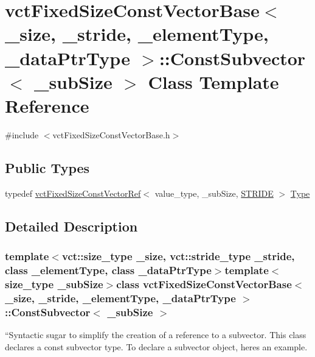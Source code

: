 \hypertarget{classvct_fixed_size_const_vector_base_1_1_const_subvector}{}\section{vct\+Fixed\+Size\+Const\+Vector\+Base$<$ \+\_\+size, \+\_\+stride, \+\_\+element\+Type, \+\_\+data\+Ptr\+Type $>$\+:\+:Const\+Subvector$<$ \+\_\+sub\+Size $>$ Class Template Reference}
\label{classvct_fixed_size_const_vector_base_1_1_const_subvector}


{\ttfamily \#include $<$vct\+Fixed\+Size\+Const\+Vector\+Base.\+h$>$}

\subsection*{Public Types}
\begin{DoxyCompactItemize}
\item 
typedef \hyperlink{classvct_fixed_size_const_vector_ref}{vct\+Fixed\+Size\+Const\+Vector\+Ref}$<$ value\+\_\+type, \+\_\+sub\+Size, \hyperlink{classvct_fixed_size_const_vector_base_a8b833ecc64bf9196c1a89a56d6f11ebbaddc2fa94f972a3bf4df3a35bec4bdc48}{S\+T\+R\+I\+D\+E} $>$ \hyperlink{classvct_fixed_size_const_vector_base_1_1_const_subvector_abe0d01ccc90fb2baf14abd8706c8de68}{Type}
\end{DoxyCompactItemize}


\subsection{Detailed Description}
\subsubsection*{template$<$vct\+::size\+\_\+type \+\_\+size, vct\+::stride\+\_\+type \+\_\+stride, class \+\_\+element\+Type, class \+\_\+data\+Ptr\+Type$>$template$<$size\+\_\+type \+\_\+sub\+Size$>$class vct\+Fixed\+Size\+Const\+Vector\+Base$<$ \+\_\+size, \+\_\+stride, \+\_\+element\+Type, \+\_\+data\+Ptr\+Type $>$\+::\+Const\+Subvector$<$ \+\_\+sub\+Size $>$}

``\+Syntactic sugar\textquotesingle{}\textquotesingle{} to simplify the creation of a reference to a subvector. This class declares a const subvector type. To declare a subvector object, here\textquotesingle{}s an example.

